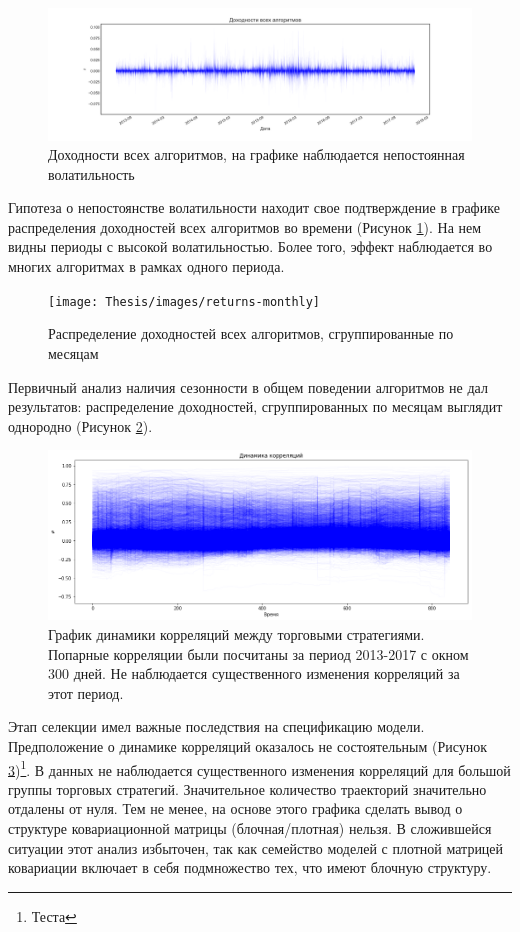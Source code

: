 \begin{figure}[h]
	\centering
	\includegraphics[width=\linewidth]{Thesis/images/returns-all.png}
	\caption{Доходности всех алгоритмов, на графике наблюдается непостоянная волатильность}
	\label{fig:allreturns}
\end{figure}

Гипотеза о непостоянстве волатильности находит свое подтверждение в графике распределения доходностей всех алгоритмов во времени (Рисунок \ref{fig:allreturns}). На нем видны периоды с высокой волатильностью. Более того, эффект наблюдается во многих алгоритмах в рамках одного периода.	

\begin{figure}
	\centering
	\texttt{[image: Thesis/images/returns-monthly]}
	\caption{Распределение доходностей всех алгоритмов, сгруппированные по месяцам}
	\label{fig:monthlyreturns}
\end{figure}

Первичный анализ наличия сезонности в общем поведении алгоритмов не дал результатов: распределение доходностей, сгруппированных по месяцам выглядит однородно (Рисунок \ref{fig:monthlyreturns}).

\begin{figure}[h]
	\centering
	\includegraphics[width=\linewidth]{Thesis/images/correlations}
	\caption{График динамики корреляций между торговыми стратегиями. Попарные корреляции были посчитаны за период 2013-2017 с окном 300 дней. Не наблюдается существенного изменения корреляций за этот период.}
	\label{fig:correlations}
\end{figure}
Этап селекции имел важные последствия на спецификацию модели. Предположение о динамике корреляций оказалось не состоятельным (Рисунок \ref{fig:correlations})\footnote{Теста}. В данных не наблюдается существенного изменения корреляций для большой группы торговых стратегий. Значительное количество траекторий значительно отдалены от нуля. Тем не менее, на основе этого графика сделать вывод о структуре ковариационной матрицы (блочная/плотная) нельзя. В сложившейся ситуации этот анализ избыточен, так как семейство моделей с плотной матрицей ковариации включает в себя подмножество тех, что имеют блочную структуру. 

